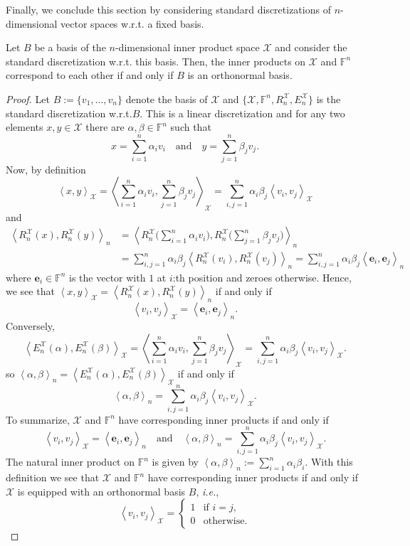 \documentclass[a4paper]{paper}
\makeatletter
\newcommand{\Spc}[1]{\mathscr{#1}}
\newcommand{\Field}{\mathbb{F}}
\newcommand*{\EXT}[2]{\ensuremath{E_{#1}^{#2}}}
\newcommand*{\REST}[2]{\ensuremath{R_{#1}^{#2}}}
\newcommand*{\RnX}{\ensuremath{\REST{n}{\Spc{X}}}}
\newcommand*{\EnX}{\ensuremath{\EXT{n}{\Spc{X}}}}
\newcommand{\ip}[2]{\left \langle #1,#2 \right\rangle}
\newcommand{\ie}{\textsl{i.e.}\xspace}
\newcommand{\wrt}{{w.r.t.}\@\xspace}
\newcommand{\ve}{\boldsymbol{e}}
\makeatother
\begin{document}
Finally, we conclude this section by considering standard discretizations of $n$-dimensional vector spaces
\wrt a fixed basis. 
\begin{theorem}
  Let $B$ be a basis of the $n$-dimensional inner product space $\Spc{X}$ and 
  consider the standard discretization \wrt this basis. 
   Then, the inner products on $\Spc{X}$ and $\Field^{n}$ correspond to each other 
   if and only if $B$ is an orthonormal basis.
\end{theorem}
\begin{proof}
Let $B := \{ v_1, \ldots, v_n \}$ denote the basis of $\Spc{X}$ and $\{ \Spc{X},\Field^{n},\RnX,\EnX\}$ 
is the standard discretization \wrt $B$. This is a linear discretization and for any two elements 
$x,y \in \Spc{X}$ there are $\alpha,\beta\in\Field^{n}$ such that 
\[  x = \sum_{i=1}^n \alpha_i v_i \quad\text{and}\quad y = \sum_{j=1}^n \beta_j v_j. \]
Now, by definition
\[ 
   \ip{x}{y}_{\Spc{X}} = \ip{\sum_{i=1}^n \alpha_i v_i }{\sum_{j=1}^n \beta_j v_j}_{\Spc{X}} 
    =    \sum_{i,j=1}^n \alpha_i\beta_j \ip{v_i}{v_j}_{\Spc{X}}
\]
and
\begin{align*}
   \ip{\RnX(x)}{\RnX(y)}_{n} &=
       \ip{\RnX\biggl( \sum_{i=1}^n \alpha_i v_i  \biggr) }
           {\RnX \biggl( \sum_{j=1}^n \beta_j v_j  \biggr)}_{n} \\
  &= \sum_{i,j=1}^n \alpha_i \beta_j \ip{\RnX(v_i)}{\RnX(v_j)}_{n} =
        \sum_{i,j=1}^n \alpha_i \beta_j \ip{\ve_i}{\ve_j}_{n}
\end{align*}
where $\ve_i\in\Field^{n}$ is the vector with $1$ at $i$:th position and zeroes otherwise. 
Hence, we see that $\ip{x}{y}_{\Spc{X}} =  \ip{\RnX(x)}{\RnX(y)}_{n}$ if and only if 
\[ \ip{v_i}{v_j}_{\Spc{X}}=\ip{\ve_i}{\ve_j}_{n}. \]
Conversely,
\[ \ip{\EnX(\alpha)}{\EnX(\beta)}_{\Spc{X}} =
       \ip{  \sum_{i=1}^n \alpha_i v_i }{ \sum_{j=1}^n \beta_j v_j }_{\Spc{X}} 
   = \sum_{i,j=1}^n \alpha_i \beta_j \ip{v_i}{v_j}_{\Spc{X}}.
\]
so $ \ip{\alpha}{\beta}_{n} = \ip{\EnX(\alpha)}{\EnX(\beta)}_{\Spc{X}}$ if and only if 
\[  \ip{\alpha}{\beta}_{n} =  \sum_{i,j=1}^n \alpha_i \beta_j \ip{v_i}{v_j}_{\Spc{X}}. \]
To summarize, $\Spc{X}$ and $\Field^{n}$ have corresponding inner products if and only if 
\[  \ip{v_i}{v_j}_{\Spc{X}}= \ip{\ve_i}{\ve_j}_{n}
    \quad\text{and}\quad
    \ip{\alpha}{\beta}_{n} = \sum_{i,j=1}^n \alpha_i \beta_j \ip{v_i}{v_j}_{\Spc{X}}. \]
The natural inner product on $\Field^{n}$ is given by 
$\ip{\alpha}{\beta}_{n} :=\sum_{i=1}^n\alpha_i \beta_i$. With this definition we see that 
$\Spc{X}$ and $\Field^{n}$ have corresponding inner products if and only if $\Spc{X}$ is equipped with an 
orthonormal basis $B$, \ie, 
\[ \ip{v_i}{v_j}_{\Spc{X}} = \begin{cases} 1 & \text{if $i=j$,} \\ 0 & \text{otherwise.} \end{cases} \]
\end{proof}
\end{document}
